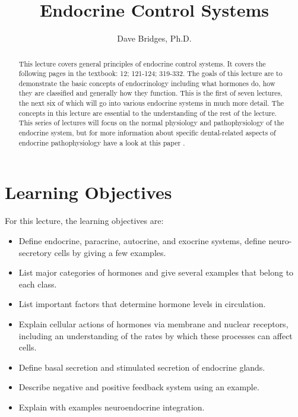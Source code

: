 \documentclass{tufte-handout}
\title{Endocrine Control Systems}
\author{Dave Bridges, Ph.D.}
\begin{document}
\maketitle%

\begin{abstract}
\noindent This lecture covers general principles of endocrine control systems.  It covers the following pages in the textbook: 12; 121-124; 319-332\cite{Widmaier2013}.  The goals of this lecture are to demonstrate the basic concepts of endocrinology including what hormones do, how they are classified and generally how they function.  This is the first of seven lectures, the next six of which will go into various endocrine systems in much more detail.  The concepts in this lecture are essential to the understanding of the rest of the lecture.  This series of lectures will focus on the normal physiology and pathophysiology of the endocrine system, but for more information about specific dental-related aspects of endocrine pathophysiology have a look at this paper \cite{Carlos2010}.
\end{abstract}

\tableofcontents

\pagebreak

\section{Learning Objectives}
For this lecture, the learning objectives are:
\begin{itemize}
\item Define endocrine, paracrine, autocrine, and exocrine systems, define neuro-secretory cells by giving a few examples.
\item List major categories of hormones and give several examples that belong to each class.
\item List important factors that determine hormone levels in circulation.
\item Explain cellular actions of hormones via membrane and nuclear receptors, including an understanding of the rates by which these processes can affect cells.
\item Define basal secretion and stimulated secretion of endocrine glands.
\item Describe negative and positive feedback system using an example.
\item Explain with examples neuroendocrine integration.
\end{itemize}
\end{document}
